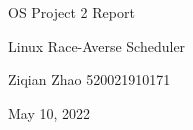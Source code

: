 \documentclass[type=course,lang=en]{sjtuthesis}
\begin{document}

\begin{titlepage}
   \begin{center}
        \vspace*{4cm} %

        \Huge{OS Project 2 Report} 

        \vspace{0.5cm}
        \LARGE{Linux Race-Averse Scheduler}
            
        \vspace{3 cm}
        \Large{}
       
        \vspace{0.25cm}
        \large{Ziqian Zhao 520021910171}
       
        \vspace{3 cm}
        \Large{May 10, 2022}
        
        \vspace{0.25 cm}
        \Large{}
       

       \vfill
    \end{center}
\end{titlepage}


\frontmatter



\tableofcontents

% 


\mainmatter







\printbibliography[heading=bibintoc]

\appendix

\captionsetup{list=no}

% 
% 

\backmatter




% 

% 

% 

\end{document}
